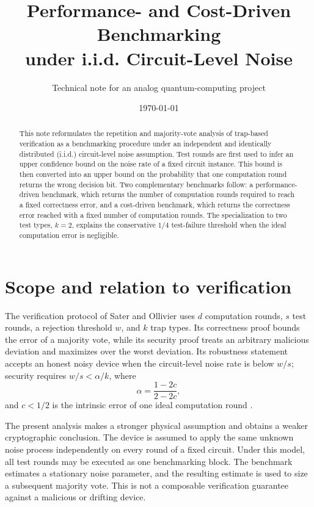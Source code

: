 \documentclass[11pt]{article}
\title{Performance- and Cost-Driven Benchmarking\\
under i.i.d. Circuit-Level Noise}
\author{Technical note for an analog quantum-computing project}
\date{\today}
\begin{document}
\maketitle

\begin{abstract}
This note reformulates the repetition and majority-vote analysis of
trap-based verification as a benchmarking procedure under an independent and
identically distributed (i.i.d.) circuit-level noise assumption. Test rounds
are first used to infer an upper confidence bound on the noise rate of a fixed
circuit instance. This bound is then converted into an upper bound on the
probability that one computation round returns the wrong decision bit. Two
complementary benchmarks follow: a performance-driven benchmark, which returns
the number of computation rounds required to reach a fixed correctness error,
and a cost-driven benchmark, which returns the correctness error reached with
a fixed number of computation rounds. The specialization to two test types,
$k=2$, explains the conservative $1/4$ test-failure threshold when the ideal
computation error is negligible.
\end{abstract}

\section{Scope and relation to verification}

The verification protocol of Sater and Ollivier uses $d$ computation rounds,
$s$ test rounds, a rejection threshold $w$, and $k$ trap types. Its correctness
proof bounds the error of a majority vote, while its security proof treats an
arbitrary malicious deviation and maximizes over the worst deviation. Its
robustness statement accepts an honest noisy device when the circuit-level
noise rate is below $w/s$; security requires $w/s<\alpha/k$, where
\begin{equation}
  \alpha=\frac{1-2c}{2-2c},
  \label{eq:alpha}
\end{equation}
and $c<1/2$ is the intrinsic error of one ideal computation round
\cite{sater2026magicblindness}.

The present analysis makes a stronger physical assumption and obtains a weaker
cryptographic conclusion. The device is assumed to apply the same unknown noise
process independently on every round of a fixed circuit. Under this model, all
test rounds may be executed as one benchmarking block. The benchmark estimates
a stationary noise parameter, and the resulting estimate is used to size a
subsequent majority vote. This is not a composable verification guarantee
against a malicious or drifting device.
\end{document}
